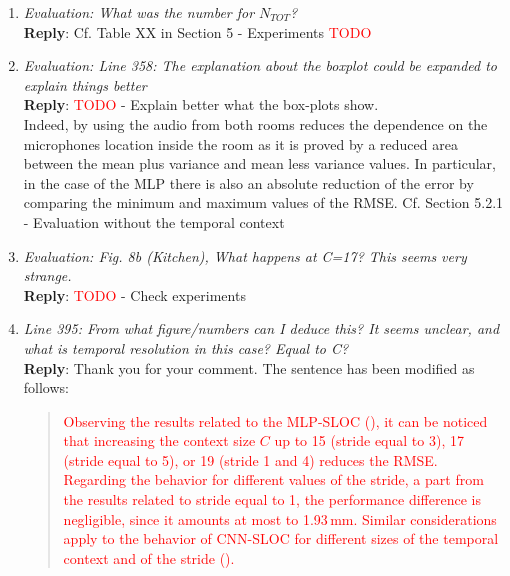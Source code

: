 \documentclass[11pt, technote, letterpaper, oneside, onecolumn]{IEEEtran}
\begin{document}
\begin{enumerate}
\item \textit{Evaluation: What was the number for $N_{TOT}$?\\}
\textbf{Reply}: Cf. Table XX in Section 5 - Experiments \textcolor{red}{TODO}

\item \textit{Evaluation: Line 358: The explanation about the boxplot could be expanded to explain things better\\}
\textbf{Reply}: \textcolor{red}{TODO} - Explain better what the box-plots show.\\
Indeed, by using the audio from both rooms reduces the dependence on the microphones location inside the room as it is proved by a reduced area between the mean plus variance and mean less variance values. In particular, in the case of the MLP there is also an absolute reduction of the error by comparing the minimum and maximum values of the RMSE. Cf. Section 5.2.1 - Evaluation without the temporal context

\item \textit{Evaluation: Fig. 8b (Kitchen), What happens at C=17? This seems very strange.\\}
\textbf{Reply}: \textcolor{red}{TODO} - Check experiments

\item \textit{Line 395: From what figure/numbers can I deduce this? It seems unclear, and what is temporal resolution in this case? Equal to C?\\}
\textbf{Reply}: Thank you for your comment. The sentence has been modified as follows:
\begin{quote}
\textcolor{red}{Observing the results related to the MLP-SLOC (), it can be noticed that increasing the context size $C$ up to 15 (stride equal to 3), 17 (stride equal to 5), or 19 (stride 1 and 4) reduces the RMSE. Regarding the behavior for different values of the stride, a part from the results related to stride equal to 1, the performance difference is negligible, since it amounts at most to 1.93\,mm. Similar considerations apply to the behavior of CNN-SLOC for different sizes of the temporal context and of the stride ().}
\end{quote}



\end{enumerate}
\end{document}
